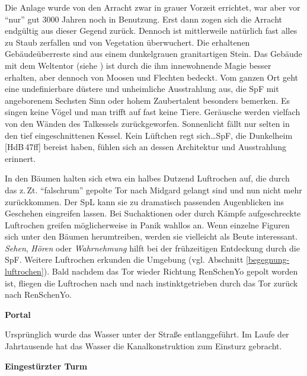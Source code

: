 \documentclass[
a4paper,
twoside,
DIV=calc,
BCOR=4mm,
fontsize=9pt,
twocolumn=on,
titlepage=on,
parskip=half
]{scrartcl}
\begin{document}
Die Anlage wurde von den Arracht zwar in grauer Vorzeit errichtet, war
aber vor "`nur"' gut 3000 Jahren noch in Benutzung. Erst dann zogen
sich die Arracht endgültig aus dieser Gegend zurück. Dennoch ist
mittlerweile natürlich fast alles zu Staub zerfallen und von
Vegetation überwuchert. Die erhaltenen Gebäudeüberreste sind aus einem
dunkelgrauen granitartigen Stein. Das Gebäude mit dem Weltentor (siehe
) ist durch die ihm innewohnende Magie besser erhalten, aber
dennoch von Moosen und Flechten bedeckt. Vom ganzen Ort geht eine
undefinierbare düstere und unheimliche Ausstrahlung aus, die SpF mit
angeborenem Sechsten Sinn oder hohem Zaubertalent besonders
bemerken. Es singen keine Vögel und man trifft auf fast keine
Tiere. Geräusche werden vielfach von den Wänden des Talkessels
zurückgeworfen. Sonnenlicht fällt nur selten in den tief
eingeschnittenen Kessel. Kein Lüftchen regt sich\dots SpF, die
Dunkelheim [HdB\,47ff] bereist haben, fühlen sich an dessen
Architektur und Ausstrahlung erinnert.

In den Bäumen halten sich etwa ein halbes Dutzend Luftrochen auf, die
durch das z.\,Zt. "`falschrum"' gepolte Tor nach Midgard gelangt sind
und nun nicht mehr zurückkommen. Der SpL kann sie zu dramatisch
passenden Augenblicken ins Geschehen eingreifen lassen. Bei
Suchaktionen oder durch Kämpfe aufgeschreckte Luftrochen greifen
möglicherweise in Panik wahllos an. Wenn einzelne Figuren sich unter
den Bäumen herumtreiben, werden sie vielleicht als Beute
interessant. \emph{Sehen}, \emph{Hören} oder \emph{Wahrnehmung} hilft
bei der frühzeitigen Entdeckung durch die SpF.  Weitere Luftrochen
erkunden die Umgebung (vgl. Abschnitt
\ref{begegnung-luftrochen}). Bald nachdem das Tor wieder Richtung
RenSchenYo gepolt worden ist, fliegen die Luftrochen nach und nach
instinktgetrieben durch das Tor zurück nach RenSchenYo.

\textbf{ Portal}


Ursprünglich wurde das Wasser unter der Straße entlanggeführt. Im
Laufe der Jahrtausende hat das Wasser die Kanalkonstruktion zum
Einsturz gebracht.

\textbf{ Eingestürzter Turm}
\end{document}
